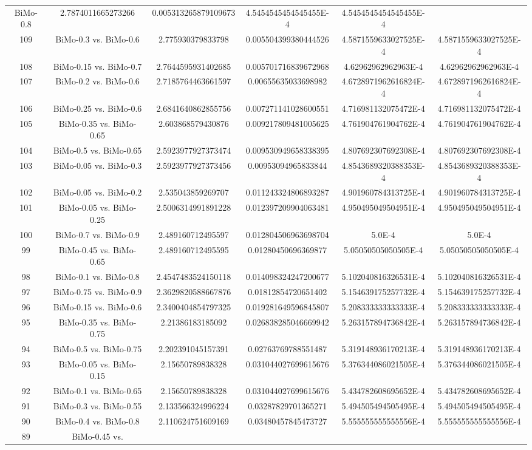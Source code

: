 \documentclass[a4paper,10pt]{article}
\begin{document}
\begin{landscape}
\begin{table}[!htp]
\begin{tabular}{cccccc}
BiMo-0.8&2.7874011665273266&0.005313265879109673&4.5454545454545455E-4&4.5454545454545455E-4\\109&BiMo-0.3 vs. BiMo-0.6&2.775930379833798&0.005504399380444526&4.5871559633027525E-4&4.5871559633027525E-4\\108&BiMo-0.15 vs. BiMo-0.7&2.7644595931402685&0.005701716839672968&4.62962962962963E-4&4.62962962962963E-4\\107&BiMo-0.2 vs. BiMo-0.6&2.7185764463661597&0.00655635033698982&4.6728971962616824E-4&4.6728971962616824E-4\\106&BiMo-0.25 vs. BiMo-0.6&2.6841640862855756&0.007271141028600551&4.716981132075472E-4&4.716981132075472E-4\\105&BiMo-0.35 vs. BiMo-0.65&2.603868579430876&0.009217809481005625&4.761904761904762E-4&4.761904761904762E-4\\104&BiMo-0.5 vs. BiMo-0.65&2.5923977927373474&0.009530949658338395&4.807692307692308E-4&4.807692307692308E-4\\103&BiMo-0.05 vs. BiMo-0.3&2.5923977927373456&0.00953094965833844&4.8543689320388353E-4&4.8543689320388353E-4\\102&BiMo-0.05 vs. BiMo-0.2&2.535043859269707&0.011243324806893287&4.901960784313725E-4&4.901960784313725E-4\\101&BiMo-0.05 vs. BiMo-0.25&2.5006314991891228&0.012397209904063481&4.950495049504951E-4&4.950495049504951E-4\\100&BiMo-0.7 vs. BiMo-0.9&2.489160712495597&0.012804506963698704&5.0E-4&5.0E-4\\99&BiMo-0.45 vs. BiMo-0.65&2.489160712495595&0.01280450696369877&5.05050505050505E-4&5.05050505050505E-4\\98&BiMo-0.1 vs. BiMo-0.8&2.4547483524150118&0.014098324247200677&5.102040816326531E-4&5.102040816326531E-4\\97&BiMo-0.75 vs. BiMo-0.9&2.3629820588667876&0.01812854720651402&5.154639175257732E-4&5.154639175257732E-4\\96&BiMo-0.15 vs. BiMo-0.6&2.3400404854797325&0.019281649596845807&5.208333333333333E-4&5.208333333333333E-4\\95&BiMo-0.35 vs. BiMo-0.75&2.21386183185092&0.026838285046669942&5.263157894736842E-4&5.263157894736842E-4\\94&BiMo-0.5 vs. BiMo-0.75&2.202391045157391&0.02763769788551487&5.319148936170213E-4&5.319148936170213E-4\\93&BiMo-0.05 vs. BiMo-0.15&2.15650789838328&0.031044027699615676&5.376344086021505E-4&5.376344086021505E-4\\92&BiMo-0.1 vs. BiMo-0.65&2.15650789838328&0.031044027699615676&5.434782608695652E-4&5.434782608695652E-4\\91&BiMo-0.3 vs. BiMo-0.55&2.133566324996224&0.03287829701365271&5.494505494505495E-4&5.494505494505495E-4\\90&BiMo-0.4 vs. BiMo-0.8&2.110624751609169&0.03480457845473727&5.555555555555556E-4&5.555555555555556E-4\\89&BiMo-0.45 vs. 
\end{tabular}
\end{table}
\end{landscape}
\end{document}
